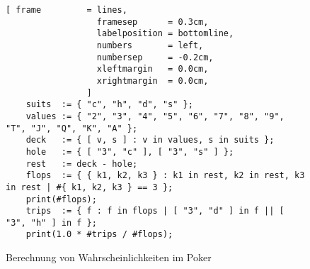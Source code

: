 \begin{figure}[!ht]
\centering
\begin{Verbatim}[ frame         = lines, 
                  framesep      = 0.3cm, 
                  labelposition = bottomline,
                  numbers       = left,
                  numbersep     = -0.2cm,
                  xleftmargin   = 0.0cm,
                  xrightmargin  = 0.0cm,
                ]
    suits  := { "c", "h", "d", "s" };
    values := { "2", "3", "4", "5", "6", "7", "8", "9", "T", "J", "Q", "K", "A" }; 
    deck   := { [ v, s ] : v in values, s in suits };
    hole   := { [ "3", "c" ], [ "3", "s" ] };
    rest   := deck - hole;
    flops  := { { k1, k2, k3 } : k1 in rest, k2 in rest, k3 in rest | #{ k1, k2, k3 } == 3 };
    print(#flops);
    trips  := { f : f in flops | [ "3", "d" ] in f || [ "3", "h" ] in f };
    print(1.0 * #trips / #flops);
\end{Verbatim}
\vspace*{-0.3cm}
\caption{Berechnung von Wahrscheinlichkeiten im Poker}
\label{fig:poker-triple.stlx}
\end{figure}

